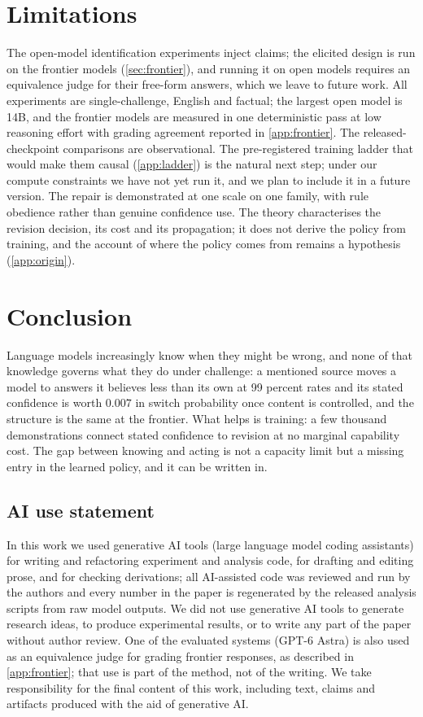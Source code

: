 \documentclass{article}
\begin{document}
\section{Limitations}
\label{sec:limits}
The open-model identification experiments inject claims; the elicited design is run on the frontier models (\cref{sec:frontier}), and running it on open models requires an equivalence judge for their free-form answers, which we leave to future work. All experiments are single-challenge, English and factual; the largest open model is 14B, and the frontier models are measured in one deterministic pass at low reasoning effort with grading agreement reported in \cref{app:frontier}. The released-checkpoint comparisons are observational. The pre-registered training ladder that would make them causal (\cref{app:ladder}) is the natural next step; under our compute constraints we have not yet run it, and we plan to include it in a future version. The repair is demonstrated at one scale on one family, with rule obedience rather than genuine confidence use. The theory characterises the revision decision, its cost and its propagation; it does not derive the policy from training, and the account of where the policy comes from remains a hypothesis (\cref{app:origin}).

\section{Conclusion}
\label{sec:conclusion}
Language models increasingly know when they might be wrong, and none of that knowledge governs what they do under challenge: a mentioned source moves a model to answers it believes less than its own at 99 percent rates and its stated confidence is worth $0.007$ in switch probability once content is controlled, and the structure is the same at the frontier. What helps is training: a few thousand demonstrations connect stated confidence to revision at no marginal capability cost. The gap between knowing and acting is not a capacity limit but a missing entry in the learned policy, and it can be written in.


\subsection*{AI use statement}
In this work we used generative AI tools (large language model coding assistants) for writing and refactoring experiment and analysis code, for drafting and editing prose, and for checking derivations; all AI-assisted code was reviewed and run by the authors and every number in the paper is regenerated by the released analysis scripts from raw model outputs. We did not use generative AI tools to generate research ideas, to produce experimental results, or to write any part of the paper without author review. One of the evaluated systems (GPT-6 Astra) is also used as an equivalence judge for grading frontier responses, as described in \cref{app:frontier}; that use is part of the method, not of the writing. We take responsibility for the final content of this work, including text, claims and artifacts produced with the aid of generative AI.
\end{document}
